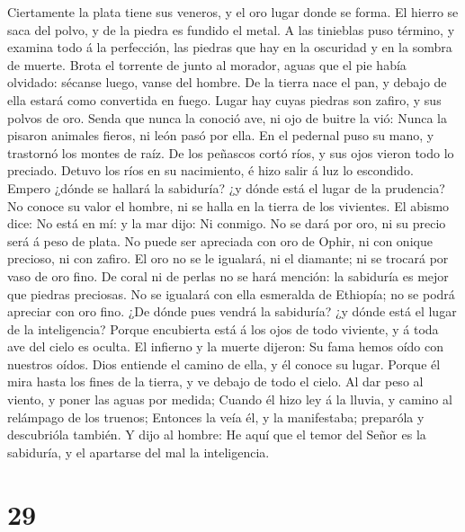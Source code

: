  Ciertamente la plata tiene sus veneros, y el oro lugar
donde se forma.  El hierro se saca del polvo, y de la
piedra es fundido el metal.  A las tinieblas puso término,
y examina todo á la perfección, las piedras que hay en la oscuridad y en
la sombra de muerte.  Brota el torrente de junto al
morador, aguas que el pie había olvidado: sécanse luego, vanse del
hombre.  De la tierra nace el pan, y debajo de ella estará
como convertida en fuego.  Lugar hay cuyas piedras son
zafiro, y sus polvos de oro.  Senda que nunca la conoció
ave, ni ojo de buitre la vió:  Nunca la pisaron animales
fieros, ni león pasó por ella.  En el pedernal puso su
mano, y trastornó los montes de raíz.  De los peñascos
cortó ríos, y sus ojos vieron todo lo preciado.  Detuvo
los ríos en su nacimiento, é hizo salir á luz lo escondido.
 Empero ¿dónde se hallará la sabiduría? ¿y dónde está el
lugar de la prudencia?  No conoce su valor el hombre, ni
se halla en la tierra de los vivientes.  El abismo dice:
No está en mí: y la mar dijo: Ni conmigo.  No se dará por
oro, ni su precio será á peso de plata.  No puede ser
apreciada con oro de Ophir, ni con onique precioso, ni con zafiro.
 El oro no se le igualará, ni el diamante; ni se trocará
por vaso de oro fino.  De coral ni de perlas no se hará
mención: la sabiduría es mejor que piedras preciosas.  No
se igualará con ella esmeralda de Ethiopía; no se podrá apreciar con oro
fino.  ¿De dónde pues vendrá la sabiduría? ¿y dónde está
el lugar de la inteligencia?  Porque encubierta está á
los ojos de todo viviente, y á toda ave del cielo es oculta.
 El infierno y la muerte dijeron: Su fama hemos oído con
nuestros oídos.  Dios entiende el camino de ella, y él
conoce su lugar.  Porque él mira hasta los fines de la
tierra, y ve debajo de todo el cielo.  Al dar peso al
viento, y poner las aguas por medida;  Cuando él hizo ley
á la lluvia, y camino al relámpago de los truenos; 
Entonces la veía él, y la manifestaba; preparóla y descubrióla también.
 Y dijo al hombre: He aquí que el temor del Señor es la
sabiduría, y el apartarse del mal la inteligencia.

\hypertarget{section-28}{%
\section{29}\label{section-28}}

